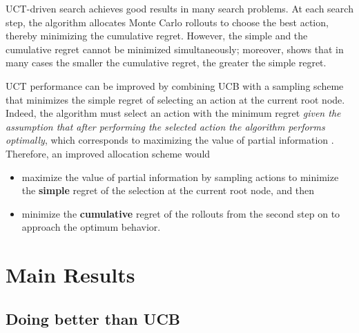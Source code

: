 \documentclass{article}
\begin{document}
UCT-driven search achieves good results in many search problems. At each
search step, the algorithm allocates Monte Carlo rollouts to choose
the best action, thereby minimizing the cumulative regret. However, the
simple and the cumulative regret cannot be minimized simultaneously;
moreover, \cite{Bubeck.pure} shows that in many cases the smaller the
cumulative regret, the greater the simple regret.

UCT performance can be improved by combining UCB with a sampling
scheme that minimizes the simple regret of selecting an action at the
current root node. Indeed, the algorithm must select an action with
the minimum regret \emph{given the assumption that after performing the selected action
the algorithm performs optimally}, which corresponds to maximizing the
value of partial information \cite{Russell.aima}. Therefore, an
improved allocation scheme would
\begin{itemize}
\item maximize the value of partial
information by sampling actions to
minimize the \textbf{simple} regret
of the selection at the current root node, and then 
\item minimize the \textbf{cumulative} regret of the rollouts from the second
  step on to approach the optimum behavior. 
\end{itemize}


\section{Main Results}

\subsection{Doing better than UCB}
\end{document}
